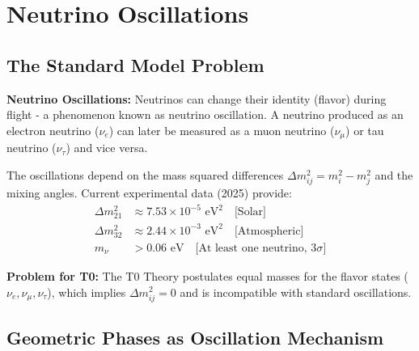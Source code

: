 \documentclass[12pt,a4paper]{article}
\begin{document}
	\section{Neutrino Oscillations}
	
	\subsection{The Standard Model Problem}
	
	\begin{warning}
		\textbf{Neutrino Oscillations:} Neutrinos can change their identity (flavor) during flight - a phenomenon known as neutrino oscillation. A neutrino produced as an electron neutrino ($\nu_e$) can later be measured as a muon neutrino ($\nu_\mu$) or tau neutrino ($\nu_\tau$) and vice versa.
		
		The oscillations depend on the mass squared differences $\Delta m^2_{ij} = m_i^2 - m_j^2$ and the mixing angles. Current experimental data (2025) provide:
		\begin{align}
			\Delta m^2_{21} &\approx 7.53 \times 10^{-5} \text{ eV}^2 \quad \text{[Solar]} \\
			\Delta m^2_{32} &\approx 2.44 \times 10^{-3} \text{ eV}^2 \quad \text{[Atmospheric]} \\
			m_\nu &> 0.06 \text{ eV} \quad \text{[At least one neutrino, 3}\sigma\text{]}
		\end{align}
		
		\textbf{Problem for T0:}
		The T0 Theory postulates equal masses for the flavor states ($\nu_e, \nu_\mu, \nu_\tau$), which implies $\Delta m^2_{ij} = 0$ and is incompatible with standard oscillations.
	\end{warning}
	
	\subsection{Geometric Phases as Oscillation Mechanism}
	
\end{document}
